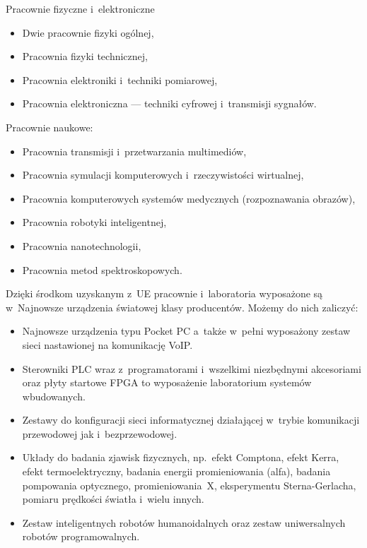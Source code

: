 \documentclass[a4paper,12pt]{article}
\begin{document}
Pracownie fizyczne i~elektroniczne
\begin{itemize}
\item{Dwie pracownie fizyki ogólnej,}
\item{Pracownia fizyki technicznej,}
\item{Pracownia elektroniki i~techniki pomiarowej,}
\item{Pracownia elektroniczna --- techniki cyfrowej i~transmisji sygnałów.}
\end{itemize}

Pracownie naukowe:
\begin{itemize}
\item{Pracownia transmisji i~przetwarzania multimediów,}
\item{Pracownia symulacji komputerowych i~rzeczywistości wirtualnej,}
\item{Pracownia komputerowych systemów medycznych (rozpoznawania obrazów),}
\item{Pracownia robotyki inteligentnej,}
\item{Pracownia nanotechnologii,}
\item{Pracownia metod spektroskopowych.}
\end{itemize}

Dzięki środkom uzyskanym z~UE pracownie i~laboratoria wyposażone są w~Najnowsze urządzenia światowej klasy producentów. Możemy do nich zaliczyć:
\begin{itemize}
\item{Najnowsze urządzenia typu Pocket PC a~także w~pełni wyposażony zestaw sieci nastawionej na komunikację VoIP.}
\item{Sterowniki PLC wraz z~programatorami i~wszelkimi niezbędnymi akcesoriami oraz płyty startowe FPGA to wyposażenie laboratorium systemów wbudowanych.}
\item{Zestawy do konfiguracji sieci informatycznej działającej w~trybie komunikacji przewodowej jak i~bezprzewodowej.}
\item{Układy do badania zjawisk fizycznych, np.~efekt Comptona, efekt Kerra, efekt termoelektryczny, badania energii promieniowania (alfa), badania pompowania optycznego, promieniowania~X, eksperymentu Sterna-Gerlacha, pomiaru prędkości światła i~wielu innych.}
\item{Zestaw inteligentnych robotów humanoidalnych oraz zestaw uniwersalnych robotów programowalnych.}
\end{itemize}
\end{document}
